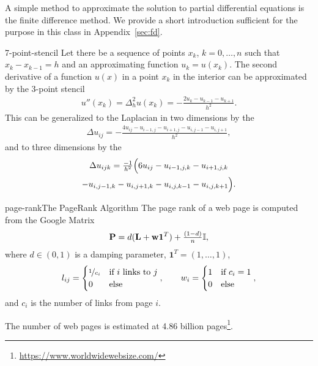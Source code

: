 \begin{intro}
  A simple method to approximate the solution to partial differential
  equations is the finite difference method. We provide a short
  introduction sufficient for the purpose in this class in
  Appendix~\ref{sec:fd}.
\end{intro}

\begin{Example}{7-point-stencil}
  Let there be a sequence of points $x_k$, $k=0,\dots,n$ such that
  $x_k-x_{k-1} = h$ and an approximating function $u_k = u(x_k)$. The
  second derivative of a function $u(x)$ in a point $x_k$ in the
  interior can be approximated by the 3-point stencil
  \begin{gather}
    u''(x_k) = \Delta_h^2 u(x_k) = - \frac{2 u_k - u_{k-1} - u_{k+1}}{h^2}.
  \end{gather}
  This can be generalized to the Laplacian in two dimensions by the 
  \begin{gather}
    \Delta u_{ij} = -\frac{4 u_{ij}- u_{i-1,j} - u_{i+1,j}- u_{i,j-1} - u_{i,j+1}}{h^2},
  \end{gather}
  and to three dimensions by the 
  \begin{multline}
    \Delta u_{ijk} = \tfrac{-1}{h^2}\Bigl(6 u_{ij}
    - u_{i-1,j,k} - u_{i+1,j,k}
    \\
    - u_{i,j-1,k} - u_{i,j+1,k}
    - u_{i,j,k-1} - u_{i,j,k+1}\Bigr).
  \end{multline}
\end{Example}

\begin{Example*}{page-rank}{The PageRank Algorithm}
  The page rank of a web page is computed from the Google Matrix
  \begin{gather}
    \mathbf P = d (\mathbf L+\mathbf w \mathbf 1^T) + \tfrac{(1-d)}{n} \mathbb I,
  \end{gather}
  where $d \in (0,1)$ is a damping parameter, $\mathbf 1^T = (1,\dots,1)$,
  \begin{gather}
    l_{ij} =
    \begin{cases}
      \nicefrac1{c_i} & \text{if $i$ links to $j$}\\0&\text{else} 
    \end{cases},
    \qquad
    w_i =
    \begin{cases}
      1 &\text{if } c_i=1\\
      0&\text{else}
    \end{cases},
  \end{gather}
  and $c_i$ is the number of links from page $i$.

  The number of web pages is estimated at 4.86 billion pages\footnote{\url{https://www.worldwidewebsize.com/}}.
\end{Example*}

